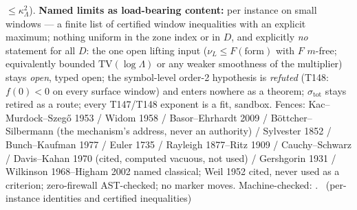\documentclass[11pt,a4paper]{article}
\begin{document}
$\le\kappa_\Lambda^2$).
\textbf{Named limits as load-bearing content:} per instance on small windows
--- a finite list of certified window inequalities with an explicit maximum;
nothing uniform in the zone index or in $D$, and explicitly \emph{no}
statement for all $D$: the one open lifting input ($\nu_L\le
F(\text{form})$ with $F$ $m$-free; equivalently bounded
$\mathrm{TV}(\log\Lambda)$ or any weaker smoothness of the multiplier)
stays \emph{open}, typed open; the symbol-level order-2 hypothesis is
\emph{refuted} (T148: $f(0)<0$ on every surface window) and enters nowhere
as a theorem; $\sigma_{\mathrm{tot}}$ stays retired as a route; every
T147/T148 exponent is a fit, sandbox. Fences: Kac--Murdock--Szeg\H{o} 1953 /
Widom 1958 / Basor--Ehrhardt 2009 / B\"ottcher--Silbermann (the mechanism's
address, never an authority) / Sylvester 1852 / Bunch--Kaufman 1977 / Euler
1735 / Rayleigh 1877--Ritz 1909 / Cauchy--Schwarz / Davis--Kahan 1970
(cited, computed vacuous, not used) / Gershgorin 1931 / Wilkinson
1968--Higham 2002 named classical; Weil 1952 cited, never used as a
criterion; zero-firewall AST-checked; no marker moves.
Machine-checked: .
\mE\ (per-instance identities and certified inequalities)
\end{document}
